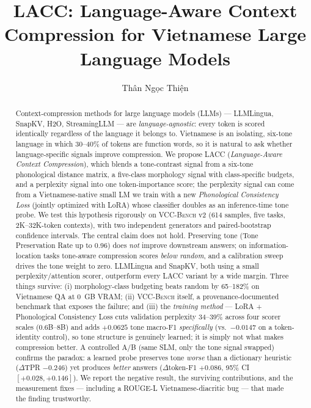 \documentclass[runningheads]{llncs}
\newcommand{\method}[1]{\textsc{#1}}
\begin{document}
\title{LACC: Language-Aware Context Compression for Vietnamese Large Language Models}


\author{Thân Ngọc Thiện}



\maketitle

\begin{abstract}
Context-compression methods for large language models (LLMs) --- LLMLingua, SnapKV, H2O, StreamingLLM --- are \emph{language-agnostic}: every token is scored identically regardless of the language it belongs to. Vietnamese is an isolating, six-tone language in which 30--40\% of tokens are function words, so it is natural to ask whether language-specific signals improve compression. We propose \method{LACC} (\emph{Language-Aware Context Compression}), which blends a tone-contrast signal from a six-tone phonological distance matrix, a five-class morphology signal with class-specific budgets, and a perplexity signal into one token-importance score; the perplexity signal can come from a Vietnamese-native small LM we train with a new \emph{Phonological Consistency Loss} (jointly optimized with LoRA) whose classifier doubles as an inference-time tone probe. We test this hypothesis rigorously on \method{VCC-Bench} v2 (614 samples, five tasks, 2K--32K-token contexts), with two independent generators and paired-bootstrap confidence intervals. The central claim does not hold. Preserving tone (Tone Preservation Rate up to 0.96) does \emph{not} improve downstream answers; on information-location tasks tone-aware compression scores \emph{below random}, and a calibration sweep drives the tone weight to zero. LLMLingua and SnapKV, both using a small perplexity/attention scorer, outperform every \method{LACC} variant by a wide margin. Three things survive: (i) morphology-class budgeting beats random by 65--182\% on Vietnamese QA at 0~GB VRAM; (ii) \method{VCC-Bench} itself, a provenance-documented benchmark that exposes the failure; and (iii) the \emph{training method} --- LoRA + Phonological Consistency Loss cuts validation perplexity 34--39\% across four scorer scales (0.6B--8B) and adds $+0.0625$ tone macro-F1 \emph{specifically} (vs.\ $-0.0147$ on a token-identity control), so tone structure is genuinely learned; it is simply not what makes compression better. A controlled A/B (same SLM, only the tone signal swapped) confirms the paradox: a learned probe preserves tone \emph{worse} than a dictionary heuristic ($\Delta$TPR $-0.246$) yet produces \emph{better} answers ($\Delta$token-F1 $+0.086$, 95\% CI $[+0.028,+0.146]$). We report the negative result, the surviving contributions, and the measurement fixes --- including a ROUGE-L Vietnamese-diacritic bug --- that made the finding trustworthy.


\end{abstract}
\end{document}
